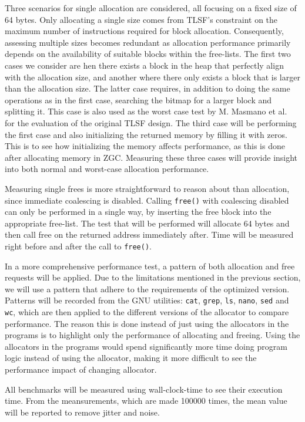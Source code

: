 Three scenarios for single allocation are considered, all focusing on a fixed size of 64 bytes. Only allocating a single size comes from TLSF's constraint on the maximum number of instructions required for block allocation. Consequently, assessing multiple sizes becomes redundant as allocation performance primarily depends on the availability of suitable blocks within the free-lists. The first two cases we consider are hen there exists a block in the heap that perfectly align with the allocation size, and another where there only exists a block that is larger than the allocation size. The latter case requires, in addition to doing the same operations as in the first case, searching the bitmap for a larger block and splitting it. This case is also used as the worst case test by M. Masmano et al.~\cite{TLSF} for the evaluation of the original TLSF design. The third case will be performing the first case and also initializing the returned memory by filling it with zeros. This is to see how initializing the memory affects performance, as this is done after allocating memory in ZGC. Measuring these three cases will provide insight into both normal and worst-case allocation performance.

Measuring single frees is more straightforward to reason about than allocation, since immediate coalescing is disabled. Calling \texttt{free()} with coalescing disabled can only be performed in a single way, by inserting the free block into the appropriate free-list. The test that will be performed will allocate 64 bytes and then call free on the returned address immediately after. Time will be measured right before and after the call to \texttt{free()}.

In a more comprehensive performance test, a pattern of both allocation and free requests will be applied. Due to the limitations mentioned in the previous section, we will use a pattern that adhere to the requirements of the optimized version. Patterns will be recorded from the GNU utilities: \texttt{cat}, \texttt{grep}, \texttt{ls}, \texttt{nano}, \texttt{sed} and \texttt{wc}, which are then applied to the different versions of the allocator to compare performance. The reason this is done instead of just using the allocators in the programs is to highlight only the performance of allocating and freeing. Using the allocators in the programs would spend significantly more time doing program logic instead of using the allocator, making it more difficult to see the performance impact of changing allocator.

All benchmarks will be measured using wall-clock-time to see their execution time. From the meansurements, which are made 100000 times, the mean value will be reported to remove jitter and noise.

